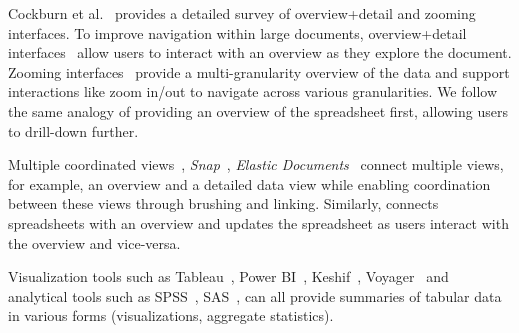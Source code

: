 Cockburn et al.~\cite{cockburn2009review}
provides a detailed survey of overview+detail
and zooming interfaces.
To improve navigation within large documents,
overview+detail interfaces~\cite{cockburn2006faster,kratz2010semi} allow users to interact with an overview as they explore the document. Zooming interfaces~\cite{nekrasovski2006evaluation,plaisant2002spacetree} provide a multi-granularity overview of the data and support interactions like zoom in/out to navigate across various granularities.
We follow the same analogy of
providing an overview of the spreadsheet first,
allowing users to drill-down further.

 Multiple coordinated views~\cite{roberts2007state}, \eg \emph{Snap}~\cite{north2000snap}, \emph{Elastic Documents}~\cite{badam2018elastic} connect multiple views, for example, an overview and a detailed data view while enabling coordination between these views through brushing and linking. Similarly, \noah connects spreadsheets with an overview and updates the spreadsheet as users interact with the overview and vice-versa.

Visualization tools such as Tableau~\cite{tableau}, Power BI~\cite{powerbi}, Keshif~\cite{yalccin2018keshif}, Voyager~\cite{wongsuphasawat2016voyager} and
analytical tools such as SPSS~\cite{noruvsis1986spss}, SAS~\cite{sas1985sas}, can all provide summaries of tabular data in various forms (visualizations,
aggregate statistics). 
